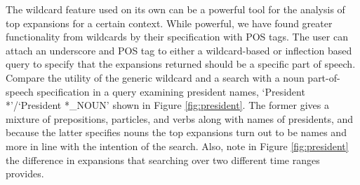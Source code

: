 \documentclass[11pt]{article}
\begin{document}
The wildcard feature used on its own can be a powerful tool for the analysis of top expansions for a certain context. While powerful, we have found greater functionality from wildcards by their specification with POS tags. The user can attach an underscore and POS tag to either a wildcard-based or inflection based query to specify that the expansions returned should be a specific part of speech. Compare the utility of the generic wildcard and a search with a noun part-of-speech specification in a query examining president names, `President *'/`President *\textsf{\textsc{\_NOUN}}' shown in Figure \ref{fig:president}. The former gives a mixture of prepositions, particles, and verbs along with names of presidents, and because the latter specifies nouns the top expansions turn out to be names and more in line with the intention of the search. Also, note in Figure \ref{fig:president} the difference in expansions that searching over two different time ranges provides.
\end{document}
